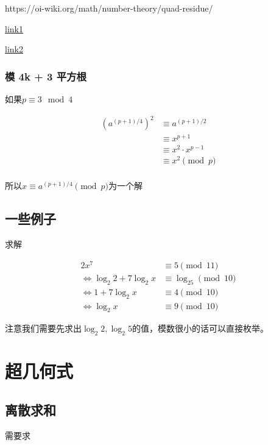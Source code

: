 \documentclass{article}
\begin{document}
https://oi-wiki.org/math/number-theory/quad-residue/

\href{https://blog.arpe1s.xyz/posts/2021/01/rth_root/}{link1}

\href{https://bbs.emath.ac.cn/thread-15822-1-1.html/
}{link2}

\subsubsection{模 4k + 3 平方根}

如果$p\equiv 3\mod{4}$

\begin{equation}
    \begin{aligned}
        \left(a^{(p+1)/4}\right)^2&\equiv a^{(p+1)/2}\\
        &\equiv x^{p+1}\\
        &\equiv x^2\cdot x^{p-1}\\
        &\equiv x^2\pmod{p}\\
    \end{aligned}
\end{equation}

所以$x\equiv a^{(p+1)/4}\pmod{p}$为一个解

\subsection{一些例子}

求解

\begin{align*}
    2x^7&\equiv 5\pmod{11}\\
    \Longleftrightarrow
    \log_2 2 + 7\log_2{x}&\equiv \log_25\pmod{10}\\
    \Longleftrightarrow
    1+7\log_2{x}&\equiv 4\pmod{10}\\
    \Longleftrightarrow
    \log_2x&\equiv 9\pmod{10}
\end{align*}

注意我们需要先求出$\log_2 2, \log_2 5$的值，模数很小的话可以直接枚举。

\section{超几何式}

\subsection{离散求和}

需要求
\end{document}
